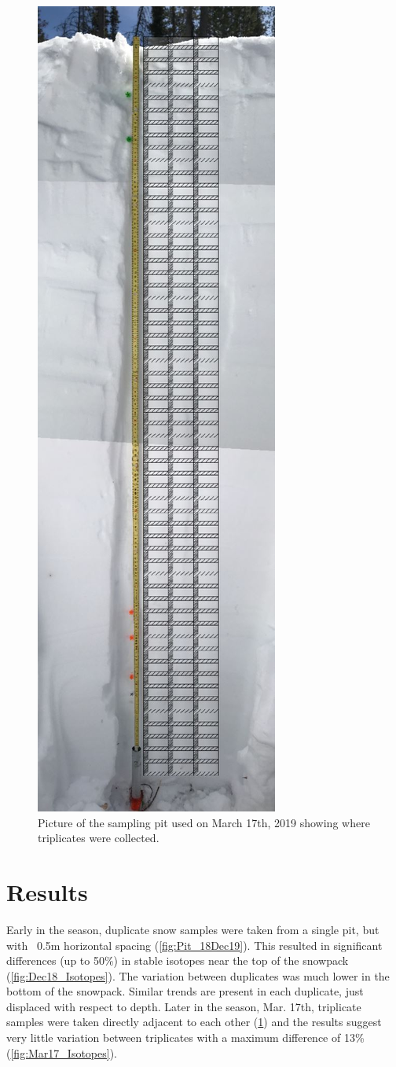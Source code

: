  \begin{figure}[H]
    \centering
    \includegraphics[width=0.3\linewidth]{figures/Pit_17Mar19.jpg}
    \caption{Picture of the sampling pit used on March 17th, 2019 showing where triplicates were collected.}
    \label{fig:Pit_17Mar19}
 \end{figure}
 
\section{Results}
Early in the season, duplicate snow samples were taken from a single pit, but with ~0.5m horizontal spacing (\ref{fig:Pit_18Dec19}). This resulted in significant differences (up to 50\%) in stable isotopes near the top of the snowpack (\ref{fig:Dec18_Isotopes}). The variation between duplicates was much lower in the bottom of the snowpack. Similar trends are present in each duplicate, just displaced with respect to depth. Later in the season, Mar. 17th, triplicate samples were taken directly adjacent to each other (\ref{fig:Pit_17Mar19}) and the results suggest very little variation between triplicates with a maximum difference of 13\% (\ref{fig:Mar17_Isotopes}). 

